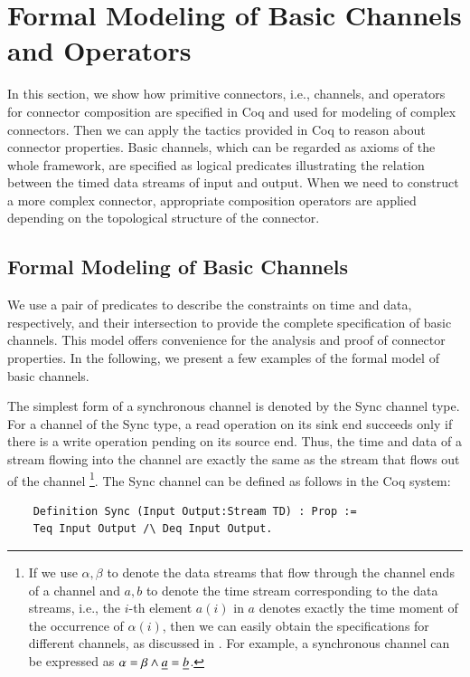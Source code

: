 \documentclass[3p,times]{elsarticle}
\begin{document}
\section{Formal Modeling of Basic Channels and Operators}\label{sec:channelandoperator}
In this section, we show how primitive connectors, i.e., channels, and operators for connector composition are specified in Coq and used for modeling of complex connectors. Then we can apply the tactics provided in Coq to reason about connector properties. Basic channels, which can be regarded as axioms of the whole framework, are specified as logical predicates illustrating the relation between the timed data streams of input and output. When we need to construct a more complex connector, appropriate composition operators are applied depending on the topological structure of the connector.

\subsection{Formal Modeling of Basic Channels}

We use a pair of predicates to describe the constraints on time and data, respectively, and their intersection to provide the complete specification of basic channels. This model offers convenience for the analysis and proof of connector properties. In the following, we present a few examples of the formal model of basic channels.

The simplest form of a synchronous channel is denoted by the Sync channel type. For a channel of the Sync type, a read operation on
its sink end succeeds only if there is a write operation pending on its source end. Thus, the time and data of a stream flowing
into the channel are exactly the same as the stream that flows out of the channel
\footnote{If we use $\alpha,\beta$ to denote the data streams that flow through the channel ends of a channel and $a,b$ to denote the time stream corresponding to the data streams, i.e., the $i$-th element $a(i)$ in $a$ denotes exactly the time moment of the occurrence of $\alpha(i)$, then we can easily obtain the specifications for different channels, as discussed in \cite{Sun12,SAA+12}. For example, a synchronous channel can be expressed as $\alpha=\beta \wedge \emph{a}=\emph{b}$.}.
The Sync channel can be defined as follows in the Coq system:
\begin{verbatim}
    Definition Sync (Input Output:Stream TD) : Prop :=
    Teq Input Output /\ Deq Input Output.
\end{verbatim}
\end{document}

